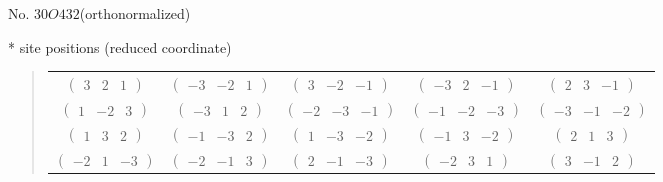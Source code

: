 \documentclass[fleqn,9pt,landscape]{jsarticle}
\begin{document}
\newpage
\begin{center}
\LARGE
No. 30\quad$O$\quad$432$\quad[ cubic ] (orthonormalized)
\end{center}
\vspace{5mm}
* site positions (reduced coordinate)
\begin{quote}
\begin{tabular}{ccccc}
$ \begin{pmatrix} 3 & 2 & 1 \end{pmatrix} $ & $ \begin{pmatrix} -3 & -2 & 1 \end{pmatrix} $ & $ \begin{pmatrix} 3 & -2 & -1 \end{pmatrix} $ & $ \begin{pmatrix} -3 & 2 & -1 \end{pmatrix} $ & $ \begin{pmatrix} 2 & 3 & -1 \end{pmatrix} $ \\
$ \begin{pmatrix} 1 & -2 & 3 \end{pmatrix} $ & $ \begin{pmatrix} -3 & 1 & 2 \end{pmatrix} $ & $ \begin{pmatrix} -2 & -3 & -1 \end{pmatrix} $ & $ \begin{pmatrix} -1 & -2 & -3 \end{pmatrix} $ & $ \begin{pmatrix} -3 & -1 & -2 \end{pmatrix} $ \\
$ \begin{pmatrix} 1 & 3 & 2 \end{pmatrix} $ & $ \begin{pmatrix} -1 & -3 & 2 \end{pmatrix} $ & $ \begin{pmatrix} 1 & -3 & -2 \end{pmatrix} $ & $ \begin{pmatrix} -1 & 3 & -2 \end{pmatrix} $ & $ \begin{pmatrix} 2 & 1 & 3 \end{pmatrix} $ \\
$ \begin{pmatrix} -2 & 1 & -3 \end{pmatrix} $ & $ \begin{pmatrix} -2 & -1 & 3 \end{pmatrix} $ & $ \begin{pmatrix} 2 & -1 & -3 \end{pmatrix} $ & $ \begin{pmatrix} -2 & 3 & 1 \end{pmatrix} $ & $ \begin{pmatrix} 3 & -1 & 2 \end{pmatrix} $ \\

\end{tabular}
\end{quote}
\end{document}
